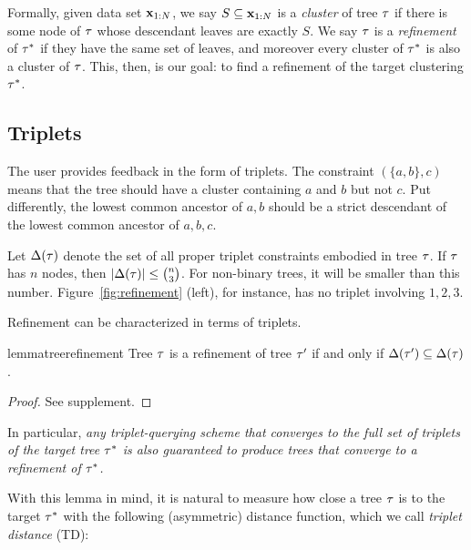Formally, given data set $\mathbf{x}_{1:N}$, we say $S \subseteq \mathbf{x}_{1:N}$ is a {\it cluster} of tree $\tau$ if there is some node of $\tau$ whose descendant leaves are exactly $S$. We say $\tau$ is a {\it refinement} of $\tau^*$ if they have the same set of leaves, and moreover every cluster of $\tau^*$ is also a cluster of $\tau$. This, then, is our goal: to find a refinement of the target clustering $\tau^*$.

\subsection{Triplets}

The user provides feedback in the form of triplets. The constraint $(\{a,b\},c)$ means that the tree should have a cluster containing $a$ and $b$ but not $c$. Put differently, the lowest common ancestor of $a,b$ should be a strict descendant of the lowest common ancestor of $a,b,c$.

Let $\Delta(\tau)$ denote the set of all proper triplet constraints embodied in tree $\tau$. If $\tau$ has $n$ nodes, then $|\Delta(\tau)| \leq {n \choose 3}$. For non-binary trees, it will be smaller than this number. Figure~\ref{fig:refinement} (left), for instance, has no triplet involving $1,2,3$. 

Refinement can be characterized in terms of triplets.
\begin{restatable}{lemma}{treerefinement}
\label{thm:treerefinement}
Tree $\tau$ is a refinement of tree $\tau'$ if and only if $\Delta(\tau') \subseteq \Delta(\tau)$.
\end{restatable}
\begin{proof}
See supplement.
\end{proof}
In particular, {\it any triplet-querying scheme that converges to the full set of triplets of the target tree $\tau^*$ is also guaranteed to produce trees that converge to a refinement of $\tau^*$.}

With this lemma in mind, it is natural to measure how close a tree $\tau$ is to the target $\tau^*$ with the following (asymmetric) distance function, which we call {\it triplet distance} (TD):


